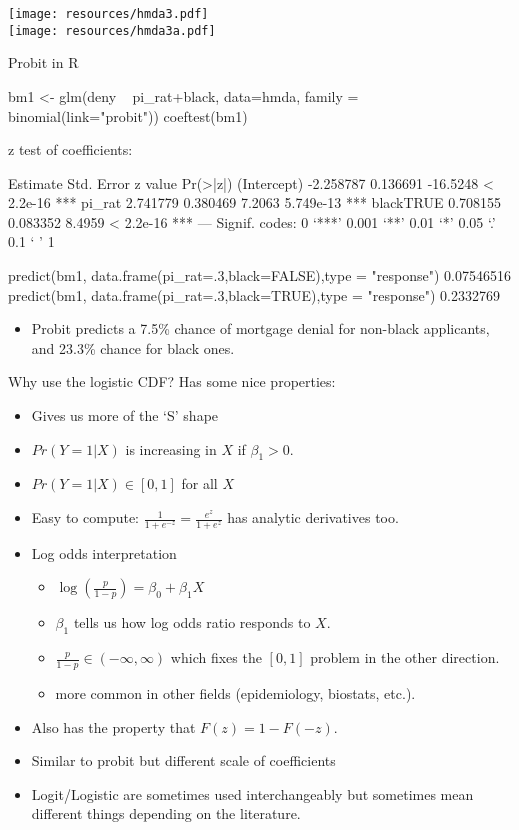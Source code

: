 \documentclass[aspectratio=169]{beamer}
\begin{document}
\begin{frame}
\begin{center}
\texttt{[image: resources/hmda3.pdf]}\\
\texttt{[image: resources/hmda3a.pdf]}\\
\end{center}
\end{frame}

\begin{frame}[fragile]{Probit in R}
\footnotesize
\begin{semiverbatim}
bm1 <- glm(deny ~ pi_rat+black, data=hmda, family = binomial(link="probit"))
coeftest(bm1)

z test of coefficients:

             Estimate Std. Error  z value  Pr(>|z|)    
(Intercept) -2.258787   0.136691 -16.5248 < 2.2e-16 ***
pi_rat       2.741779   0.380469   7.2063 5.749e-13 ***
blackTRUE    0.708155   0.083352   8.4959 < 2.2e-16 ***
---
    Signif. codes:  0 `***' 0.001 `**' 0.01 `*' 0.05 `.' 0.1 ` ' 1

predict(bm1, data.frame(pi_rat=.3,black=FALSE),type = "response")
    0.07546516
predict(bm1, data.frame(pi_rat=.3,black=TRUE),type = "response")
    0.2332769
\end{semiverbatim}
\begin{itemize}
\item Probit predicts a 7.5\% chance of mortgage denial for non-black applicants, and 23.3\% chance for black ones.
\end{itemize}
\end{frame}

\begin{frame}{Why use the logistic CDF?}
Has some nice properties:
\begin{itemize}
\item Gives us more of the `S' shape
\item $Pr(Y=1|X)$ is increasing in $X$ if $\beta_1>0$.
\item $Pr(Y=1|X) \in [0,1]$ for all $X$
\item Easy to compute: $\frac{1}{1+e^{-z}}=\frac{e^{z}}{1+e^{z}}$ has analytic derivatives too.
\item Log odds interpretation
\begin{itemize}
\item $\log(\frac{p}{1-p}) = \beta_0 + \beta_1 X$
\item $\beta_1$ tells us how \alert{log odds ratio} responds to $X$.
\item $\frac{p}{1-p} \in (-\infty,\infty)$ which fixes the $[0,1]$ problem in the other direction.
\item more common in other fields (epidemiology, biostats, etc.).
\end{itemize}
\item Also has the property that $F(z) = 1-F(-z)$.
\item Similar to probit but different scale of coefficients
\item Logit/Logistic are sometimes used interchangeably but sometimes mean different things depending on the literature.
\end{itemize}
\end{frame}
\end{document}
